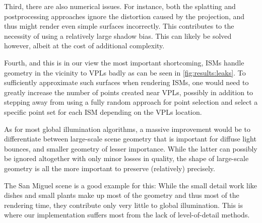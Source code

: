  Third, there are also numerical issues. For instance, both the splatting and postprocessing approaches ignore the distortion caused by the projection, and thus might render even simple surfaces incorrectly. This contributes to the necessity of using a relatively large shadow bias. This can likely be solved however, albeit at the cost of additional complexity.

 Fourth, and this is in our view the most important shortcoming, ISMs handle geometry in the vicinity to VPLs badly as can be seen in \cref{fig:results:leaks}. To sufficiently approximate such surfaces when rendering ISMs, one would need to greatly increase the number of points created near VPLs, possibly in addition to stepping away from using a fully random approach for point selection and select a specific point set for each ISM depending on the VPLs location.

 As for most global illumination algorithms, a massive improvement would be to differentiate between large-scale scene geometry that is important for diffuse light bounces, and smaller geometry of lesser importance. While the latter can possibly be ignored altogether with only minor losses in quality, the shape of large-scale geometry is all the more important to preserve (relatively) precisely.

 The San Miguel scene is a good example for this: While the small detail work like dishes and small plants make up most of the geometry and thus most of the rendering time, they contribute only very little to global illumination. This is where our implementation suffers most from the lack of level-of-detail methods.
